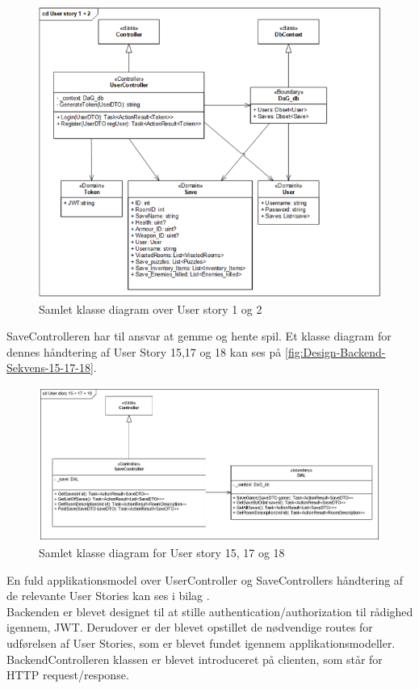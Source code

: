 \begin{figure}[H]
\centering
\includegraphics[width = \textwidth]{02-Body/Images/Backend_klasse_1_2.PNG}
\caption{Samlet klasse diagram over User story 1 og 2}
\label{fig:Design-Backend-Klasse-1-2}
\end{figure}

\noindent SaveControlleren har til ansvar at gemme og hente spil. Et klasse diagram for dennes håndtering af User Story 15,17 og 18 kan ses på \autoref{fig:Design-Backend-Sekvens-15-17-18}.\\


\begin{figure}[H]
\centering
\includegraphics[width = \textwidth]{02-Body/Images/Backend_klasse_15_17_18.PNG}
\caption{Samlet klasse diagram for User story 15, 17 og 18}
\label{fig:Design-Backend-Sekvens-15-17-18}
\end{figure}

\noindent En fuld applikationsmodel over UserController og SaveControllers håndtering af de relevante User Stories kan ses i bilag \parencite[][Section 5]{TekniskBilag}.\\

Backenden er blevet designet til at stille authentication/authorization til rådighed igennem, JWT. 
Derudover er der blevet opstillet de nødvendige routes for udførelsen af User Stories, som
er blevet fundet igennem applikationsmodeller. BackendControlleren klassen er blevet introduceret 
på clienten, som står for HTTP request/response.\\ 

\newpage
